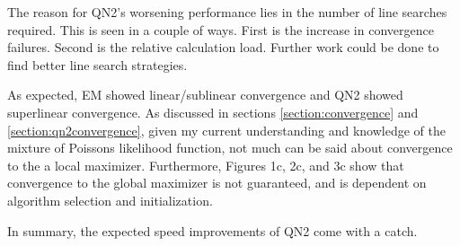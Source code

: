 \documentclass[letter,12pt]{article}
\begin{document}
The reason for QN2's worsening performance lies in the number of line searches required.  This is seen in a couple of ways.  First is the increase in convergence failures.  Second is the relative calculation load.  Further work could be done to find better line search strategies. 

As expected, EM showed linear/sublinear convergence and QN2 showed superlinear convergence.  As discussed in sections \ref{section:convergence} and \ref{section:qn2convergence}, given my current understanding and knowledge of the mixture of Poissons likelihood function, not much can be said about convergence to the a local maximizer.  Furthermore, Figures 1c, 2c, and 3c show that convergence to the global maximizer is not guaranteed, and is dependent on algorithm selection and initialization.

In summary, the expected speed improvements of QN2 come with a catch.


\pagebreak


\end{document}
